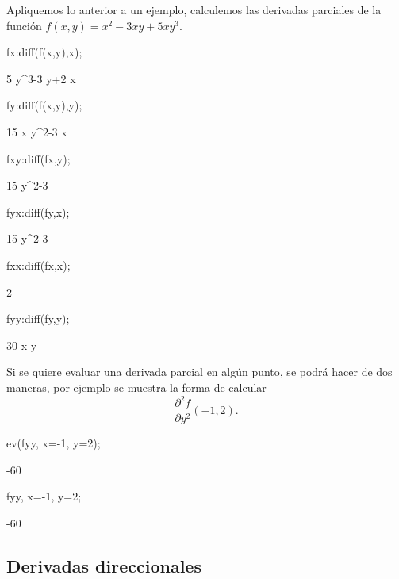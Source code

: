 Apliquemos lo anterior a un ejemplo,
calculemos las derivadas parciales de la función
$f(x,y) = x^2-3xy+5xy^3$.
\begin{maximal}
 fx:diff(f(x,y),x);
\end{maximal}
\begin{maximao}
 5 {{y}^{3}}-3 y+2 x
\end{maximao}
\begin{maximai}
 fy:diff(f(x,y),y);
\end{maximai}
\begin{maximao}
 15 x {{y}^{2}}-3 x
\end{maximao}
\begin{maximai}
 fxy:diff(fx,y);
\end{maximai}
\begin{maximao}
 15 {{y}^{2}}-3
\end{maximao}
\begin{maximai}
 fyx:diff(fy,x);
\end{maximai}
\begin{maximao}
 15 {{y}^{2}}-3
\end{maximao}
\begin{maximai}
 fxx:diff(fx,x);
\end{maximai}
\begin{maximao}
 2
\end{maximao}
\begin{maximai}
 fyy:diff(fy,y);
\end{maximai}
\begin{maximao}
 30 x y
\end{maximao}
Si se quiere evaluar una derivada parcial en algún punto,
se podrá hacer de dos maneras, por ejemplo se muestra la
forma de calcular
\begin{equation*}
\frac{\partial^2 f}{\partial y^2}(-1,2).
\end{equation*}
\begin{maximai}
 ev(fyy, x=-1, y=2);
\end{maximai}
\begin{maximao}
 -60
\end{maximao}
\begin{maximai}
 fyy, x=-1, y=2;
\end{maximai}
\begin{maximao}
 -60
\end{maximao}

\subsection{Derivadas direccionales}

